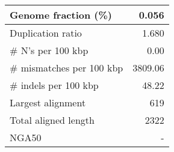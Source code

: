 \documentclass[12pt,a4paper]{article}
\begin{document}
\begin{table}[ht]
\begin{center}
\begin{tabular}{|l*{1}{|r}|}
Genome fraction (\%) & 0.056 \\ \hline
Duplication ratio & 1.680 \\ \hline
\# N's per 100 kbp & 0.00 \\ \hline
\# mismatches per 100 kbp & 3809.06 \\ \hline
\# indels per 100 kbp & 48.22 \\ \hline
Largest alignment & 619 \\ \hline
Total aligned length & 2322 \\ \hline
NGA50 & - \\ \hline
\end{tabular}
\end{center}
\end{table}
\end{document}
